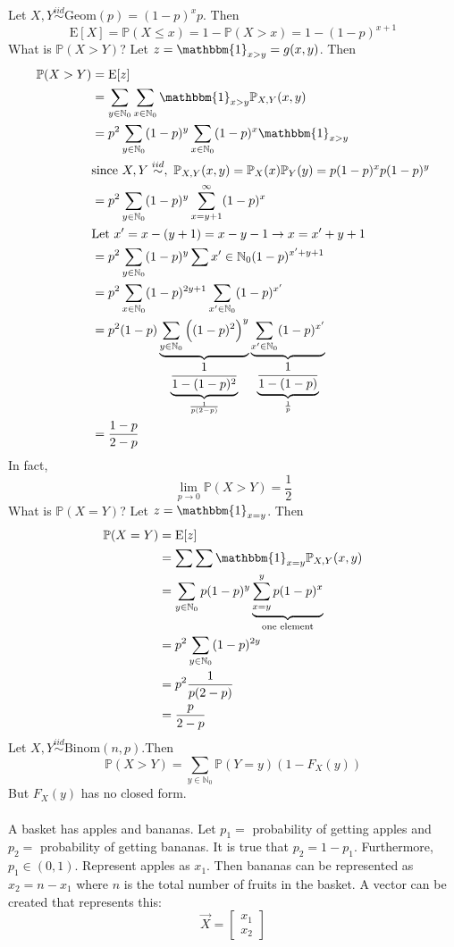 \documentclass[12pt]{article}
\newcommand{\prob}[1]{\mathbb{P}(#1)}
\newcommand{\probsub}[2]{\mathbb{P}_{#1}(#2)}
\newcommand{\indicator}[1]{\mathbbm{1}_{#1}}
\newcommand{\iid}{\stackrel{iid}{\sim}}
\newcommand{\expected}[1]{\mathrm{E}[#1]}
\begin{document}
Let $X, Y \iid \text{Geom}(p) = (1 - p)^xp $. Then $$\expected{X} = \prob{X \leq x} = 1 - \prob{X > x} = 1 - (1 - p)^{x + 1} $$ What is $\prob{X > Y}$? Let $z = \indicator{x > y} = g(x, y)$. Then $$\begin{aligned} 
\prob{X > Y} &= \expected{z} \\ &= \sum_{y \in \mathbb{N}_0} \sum_{x \in \mathbb{N}_0} \indicator{x > y} \probsub{X, Y}{x, y} \\ &= p^2 \sum_{y \in \mathbb{N}_0} (1 - p)^y \sum_{x \in \mathbb{N}_0} (1 - p)^x \indicator{x > y} \\ &\text{since }X, Y \iid, ~ \probsub{X, Y}{x, y} = \probsub{X}{x}\probsub{Y}{y} = p(1 - p)^xp(1 - p)^y \\ &= p^2 \sum_{y \in \mathbb{N}_0} (1 - p)^y \sum_{x = y + 1}^\infty (1 - p)^x \\ &\text{Let } x' = x - (y + 1) = x - y - 1 \to x = x' + y + 1 \\ &= p^2 \sum_{y \in \mathbb{N}_0} (1 - p)^y \sum{x' \in \mathbb{N}_0} (1 - p)^{x' + y + 1} \\ &= p^2 \sum_{x \in \mathbb{N}_0} (1 - p)^{2y + 1} \sum_{x' \in \mathbb{N}_0} (1 - p)^{x'} \\ &= p^2(1 - p)\underbrace{\sum_{y \in \mathbb{N}_0} \Big((1 - p)^2\Big)^y}_{\underbrace{\frac{1}{1 - (1 - p)^2}}_{\frac{1}{p(2 - p)}}} \underbrace{\sum_{x' \in \mathbb{N}_0} (1 - p)^{x'}}_{\underbrace{\frac{1}{1 - (1 - p)}}_{\frac{1}{p}}} \\ &= \frac{1 - p}{2 - p} \end{aligned} $$ 
In fact, $$\lim_{p \to 0} \prob{X > Y} = \frac{1}{2}$$ 
What is $\prob{X = Y}$? Let $z = \indicator{x = y}$. Then 
$$\begin{aligned} \prob{X = Y} &= \expected{z} \\ &= \sum \sum \indicator{x = y} \probsub{X, Y}{x, y} \\ &= \sum_{y \in \mathbb{N}_0} p(1 - p)^y \underbrace{\sum_{x = y}^y p(1 - p)^x}_{\text{one element}} \\ &= p^2\sum_{y \in \mathbb{N}_0} (1 - p)^{2y} \\ &= p^2 \frac{1}{p(2 - p)} \\ &= \frac{p}{2 - p} \end{aligned} $$ 
Let $X, Y \iid \text{Binom}(n, p)$.Then $$\prob{X > Y} = \sum_{y \in \mathbb{N}_0} \prob{Y = y}(1 - F_X(y))$$ But $F_X(y)$ has no closed form. \\~\\
A basket has apples and bananas. Let $p_1 = $ probability of getting apples and $p_2 = $ probability of getting bananas. It is true that $p_2 = 1 - p_1$. Furthermore, $p_1 \in (0, 1)$. Represent apples as $x_1$. Then bananas can be represented as $x_2 = n - x_1$ where $n$ is the total number of fruits in the basket. A vector can be created that represents this: $$\vec{X} = \begin{bmatrix} x_1 \\ x_2 \end{bmatrix} $$ 
\end{document}
